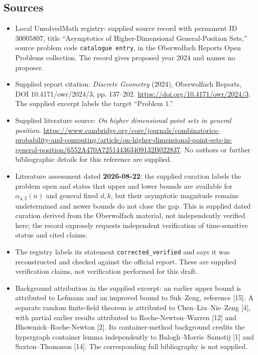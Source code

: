 \documentclass[11pt]{article}
\begin{document}
\subsection{Sources}
\begin{itemize}
\item Local UnsolvedMath registry: supplied source record with permanent ID \(30005807\), title ``Asymptotics of Higher-Dimensional General-Position Sets,'' source problem code \texttt{catalogue entry}, in the Oberwolfach Reports Open Problems collection. The record gives proposed year 2024 and names no proposer.
\item Supplied report citation: \emph{Discrete Geometry} (2024), Oberwolfach Reports, DOI 10.4171/owr/2024/3, pp. 137--202. \url{https://doi.org/10.4171/owr/2024/3}. The supplied excerpt labels the target ``Problem 1.''
\item Supplied literature source: \emph{On higher dimensional point sets in general position}. \url{https://www.cambridge.org/core/journals/combinatorics-probability-and-computing/article/on-higher-dimensional-point-sets-in-general-position/6552A470A725144363409132B022837}. No authors or further bibliographic details for this reference are supplied.
\item Literature assessment dated \textbf{2026-08-22}: the supplied curation labels the problem open and states that upper and lower bounds are available for \(\alpha_{4,2}(n)\) and general fixed \(d,k\), but their asymptotic magnitude remains undetermined and newer bounds do not close the gap. This is supplied dated curation derived from the Oberwolfach material, not independently verified here; the record expressly requests independent verification of time-sensitive status and cited claims.
\item The registry labels its statement \texttt{corrected\_verified} and says it was reconstructed and checked against the official report. These are supplied verification claims, not verification performed for this draft.
\item Background attribution in the supplied excerpt: an earlier upper bound is attributed to Lefmann and an improved bound to Suk--Zeng, reference [15]. A separate random finite-field theorem is attributed to Chen--Liu--Nie--Zeng [4], with partial earlier results attributed to Roche-Newton--Warren [12] and Bhowmick--Roche-Newton [2]. Its container-method background credits the hypergraph container lemma independently to Balogh--Morris--Samotij [1] and Saxton--Thomason [14]. The corresponding full bibliography is not supplied.
\end{itemize}
\end{document}
